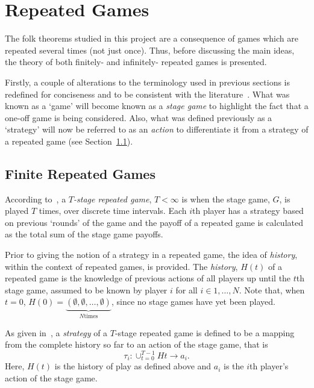 \section{Repeated Games}\label{sec:Repeated_Games}
The folk theorems studied in this project are a consequence of games which are
repeated several times (not just once). Thus, before discussing the main ideas,
the theory of both finitely- and infinitely- repeated games is presented.

Firstly, a couple of alterations to the terminology used in
previous sections is redefined for conciseness and to be consistent with the
literature~\cite{}. What was known as a `game' will become known as a
\emph{stage game} to highlight the fact that a one-off game is being considered.
Also, what was defined previously as a `strategy' will now be referred to as an
\emph{action} to differentiate it from a strategy of a repeated game (see
Section~\ref{subsec:Finite_Repeated_Games}).

\subsection{Finite Repeated Games}\label{subsec:Finite_Repeated_Games}
According to~\cite{Knight2017a}, a \textit{\(T\)-stage repeated game}, \(T <
\infty\) is when the stage game, \(G\), is played \(T\) times, over discrete
time intervals. Each \(i\)th player has a strategy based on previous `rounds' of
the game and the payoff of a repeated game is calculated as the total sum of the
stage game payoffs.

Prior to giving the notion of a strategy in a repeated game, the idea of 
\emph{history}, within the context of repeated games, is provided.
The \textit{history}, \(H(t)\) of a repeated game is the knowledge of previous
actions of all players up until the \(t\)th stage game, assumed to be known by
player \(i\) for all \(i \in 1, \ldots, N\). Note that, when \(t=0\), \(H(0) =
\underbrace{(\emptyset, \emptyset, \ldots, \emptyset)}_{N \text{times}}\), since
no stage games have yet been played.

As given in~\cite{Knight2019a}, a \textit{strategy} of a \(T\)-stage repeated
game is defined to be a mapping from the complete history so far to an action of
the stage game, that is 
\[
    \tau_{i} : \cup_{t = 0}^{T-1}{H{t}} \to a_{i}. 
\]
Here, \(H(t)\) is the history of play as defined above and \(a_{i}\) is the
\(i\)th player's action of the stage game. 

